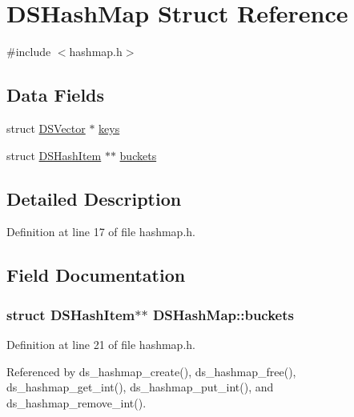 \hypertarget{structDSHashMap}{}\section{D\+S\+Hash\+Map Struct Reference}
\label{structDSHashMap}


{\ttfamily \#include $<$hashmap.\+h$>$}

\subsection*{Data Fields}
\begin{DoxyCompactItemize}
\item 
struct \hyperlink{structDSVector}{D\+S\+Vector} $\ast$ \hyperlink{structDSHashMap_ac6209316aa09678207cf1389fc2b56e4}{keys}
\item 
struct \hyperlink{structDSHashItem}{D\+S\+Hash\+Item} $\ast$$\ast$ \hyperlink{structDSHashMap_a1b66733089d09825ee88bf3a2f8022a3}{buckets}
\end{DoxyCompactItemize}


\subsection{Detailed Description}


Definition at line 17 of file hashmap.\+h.



\subsection{Field Documentation}
\subsubsection[{\texorpdfstring{buckets}{buckets}}]{\setlength{\rightskip}{0pt plus 5cm}struct {\bf D\+S\+Hash\+Item}$\ast$$\ast$ D\+S\+Hash\+Map\+::buckets}\hypertarget{structDSHashMap_a1b66733089d09825ee88bf3a2f8022a3}{}\label{structDSHashMap_a1b66733089d09825ee88bf3a2f8022a3}


Definition at line 21 of file hashmap.\+h.



Referenced by ds\+\_\+hashmap\+\_\+create(), ds\+\_\+hashmap\+\_\+free(), ds\+\_\+hashmap\+\_\+get\+\_\+int(), ds\+\_\+hashmap\+\_\+put\+\_\+int(), and ds\+\_\+hashmap\+\_\+remove\+\_\+int().

